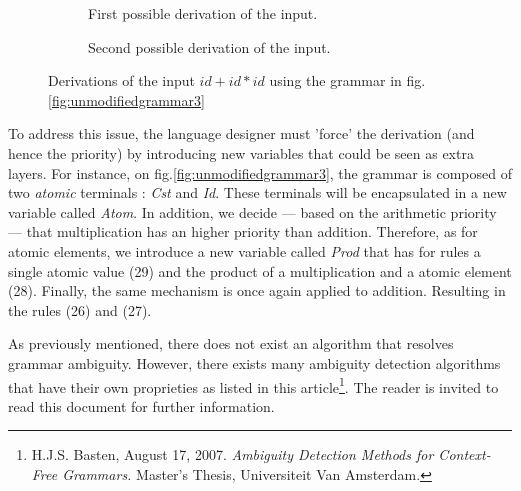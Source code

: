 \documentclass[a4paper,11pt]{article}
\begin{document}
  \begin{figure}[h!]
    \centering
    \begin{subfigure}[b]{0.4\textwidth}
      \caption{First possible derivation of the input.}
      \label{fig:ambiguoustree1}
    \end{subfigure}
    \hfill
    \begin{subfigure}[b]{0.4\textwidth}
      \caption{Second possible derivation of the input.}
      \label{fig:ambiguoustree2}
    \end{subfigure}
    \caption{Derivations of the input $id+id*id$ using the grammar in fig.\ref{fig:unmodifiedgrammar3}}
  \end{figure}
  To address this issue, the language designer must 'force' the derivation (and hence the priority) by introducing new variables that could be seen as extra layers. For instance, on fig.\ref{fig:unmodifiedgrammar3}, the grammar is composed of two \textit{atomic} terminals : \textit{Cst} and \textit{Id}. These terminals will be encapsulated in a new variable called \textit{Atom}. In addition, we decide --- based on the arithmetic priority --- that multiplication has an higher priority than addition. Therefore, as for atomic elements, we introduce a new variable called \textit{Prod} that has for rules a single atomic value (29) and the product of a multiplication and a atomic element (28). Finally, the same mechanism is once again applied to addition. Resulting in the rules (26) and (27).\\
  \begin{tcolorbox}
    As previously mentioned, there does not exist an algorithm that resolves grammar ambiguity. However, there exists many ambiguity detection algorithms that have their own proprieties as listed in this article\footnote{H.J.S. Basten, August 17, 2007. \textit{Ambiguity Detection Methods for Context-Free Grammars.} Master's Thesis, Universiteit Van Amsterdam.}. The reader is invited to read this document for further information.
  \end{tcolorbox}
\end{document}
